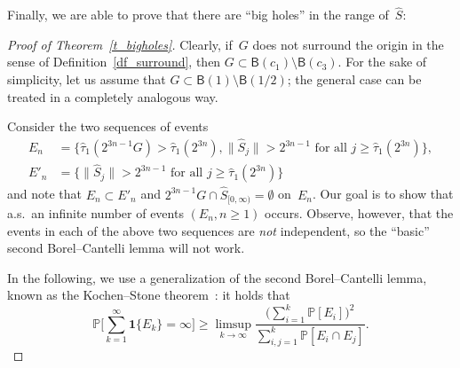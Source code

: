 \documentclass[AHL,Unicode,longabstracts]{cedram}
\newcommand{\1}[1]{{\mathbf 1}{\{#1\}}}
\newcommand{\s}{{\widehat S}}
\newcommand{\8}{{\infty}}
\newcommand{\IP}{{\mathbb P}}
\newcommand{\htau}{\widehat{\tau}}
\newcommand{\B}{{\mathsf B}}
\begin{document}
Finally, we are able to prove that there are ``big holes'' in the range of~$\s$:
\begin{proof}[Proof of Theorem~\ref{t_bigholes}]
Clearly, if~$G$ does not surround the origin in the sense of Definition~\ref{df_surround}, then $G\subset \B(c_1)\setminus \B(c_3)$. For the sake of simplicity, let us assume that $G\subset\B(1)\setminus \B(1/2)$; the general case can be treated in a completely analogous way.

Consider the two sequences of events
\begin{align*}
E_n &= \big\{\htau_1(2^{3n-1}G)>\htau_1(2^{3n}),
\|\s_j\| > 2^{3n-1} \text{ for all } j\geq \htau_1(2^{3n})\big\},\\
E'_n &= \big\{
\|\s_j\| > 2^{3n-1} \text{ for all } j\geq \htau_1(2^{3n})\big\}
\end{align*}
and note that $E_n\subset E'_n$ and $2^{3n-1}G\cap \s_{[0,\infty)}=\emptyset$ on~$E_n$. Our goal is to show that a.s.\ an infinite number of events $(E_n, n\geq 1)$ occurs. Observe, however, that the events in each of the above two sequences are \emph{not} independent, so the ``basic'' second Borel--Cantelli lemma will not work.

In the following, we use a generalization of the second Borel--Cantelli lemma, known as the Kochen--Stone theorem~\cite{KS64}: it holds that
\begin{equation}\label{Kochen--Stone}
\IP\Big[\sum_{k=1}^\infty \1{E_k}=\infty\Big] \geq
\limsup_{k\to\infty} \frac{\big(\sum_{i=1}^k\IP[E_i]\big)^2} {\sum_{i,j=1}^k\IP[E_i\cap E_j]}.
\end{equation}


\end{proof}
\end{document}
